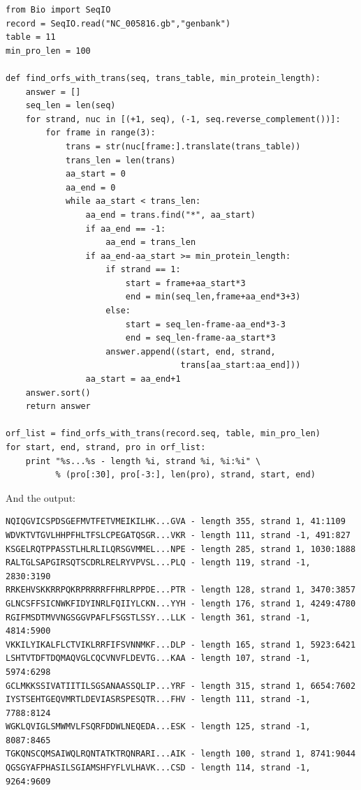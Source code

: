 \documentclass{report}
\begin{document}
\begin{verbatim}
from Bio import SeqIO 
record = SeqIO.read("NC_005816.gb","genbank")
table = 11
min_pro_len = 100

def find_orfs_with_trans(seq, trans_table, min_protein_length):
    answer = []
    seq_len = len(seq)
    for strand, nuc in [(+1, seq), (-1, seq.reverse_complement())]:
        for frame in range(3):
            trans = str(nuc[frame:].translate(trans_table))
            trans_len = len(trans)
            aa_start = 0
            aa_end = 0
            while aa_start < trans_len:
                aa_end = trans.find("*", aa_start)
                if aa_end == -1:
                    aa_end = trans_len
                if aa_end-aa_start >= min_protein_length:
                    if strand == 1:
                        start = frame+aa_start*3
                        end = min(seq_len,frame+aa_end*3+3)
                    else:
                        start = seq_len-frame-aa_end*3-3
                        end = seq_len-frame-aa_start*3                        
                    answer.append((start, end, strand,
                                   trans[aa_start:aa_end]))
                aa_start = aa_end+1
    answer.sort()
    return answer

orf_list = find_orfs_with_trans(record.seq, table, min_pro_len)
for start, end, strand, pro in orf_list:
    print "%s...%s - length %i, strand %i, %i:%i" \
          % (pro[:30], pro[-3:], len(pro), strand, start, end)
\end{verbatim}

\noindent And the output:

\begin{verbatim}
NQIQGVICSPDSGEFMVTFETVMEIKILHK...GVA - length 355, strand 1, 41:1109
WDVKTVTGVLHHPFHLTFSLCPEGATQSGR...VKR - length 111, strand -1, 491:827
KSGELRQTPPASSTLHLRLILQRSGVMMEL...NPE - length 285, strand 1, 1030:1888
RALTGLSAPGIRSQTSCDRLRELRYVPVSL...PLQ - length 119, strand -1, 2830:3190
RRKEHVSKKRRPQKRPRRRRFFHRLRPPDE...PTR - length 128, strand 1, 3470:3857
GLNCSFFSICNWKFIDYINRLFQIIYLCKN...YYH - length 176, strand 1, 4249:4780
RGIFMSDTMVVNGSGGVPAFLFSGSTLSSY...LLK - length 361, strand -1, 4814:5900
VKKILYIKALFLCTVIKLRRFIFSVNNMKF...DLP - length 165, strand 1, 5923:6421
LSHTVTDFTDQMAQVGLCQCVNVFLDEVTG...KAA - length 107, strand -1, 5974:6298
GCLMKKSSIVATIITILSGSANAASSQLIP...YRF - length 315, strand 1, 6654:7602
IYSTSEHTGEQVMRTLDEVIASRSPESQTR...FHV - length 111, strand -1, 7788:8124
WGKLQVIGLSMWMVLFSQRFDDWLNEQEDA...ESK - length 125, strand -1, 8087:8465
TGKQNSCQMSAIWQLRQNTATKTRQNRARI...AIK - length 100, strand 1, 8741:9044
QGSGYAFPHASILSGIAMSHFYFLVLHAVK...CSD - length 114, strand -1, 9264:9609
\end{verbatim}
\end{document}
